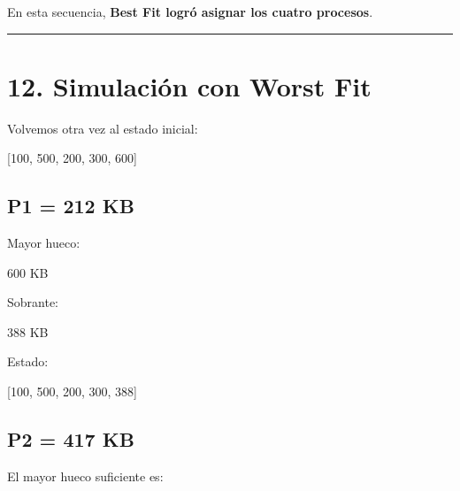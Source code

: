 \documentclass[
  spanish,
  letterpaper,
]{scrbook}
\newenvironment{Shaded}{\begin{snugshade}}{\end{snugshade}}
\newcommand{\NormalTok}[1]{\textcolor[rgb]{0.00,0.23,0.31}{#1}}
\begin{document}
En esta secuencia, \textbf{Best Fit logró asignar los cuatro procesos}.

\begin{center}\rule{0.5\linewidth}{0.5pt}\end{center}


\chapter{12. Simulación con Worst
Fit}\label{simulaciuxf3n-con-worst-fit-1}

Volvemos otra vez al estado inicial:

\begin{Shaded}
\begin{Highlighting}[]
\NormalTok{[100, 500, 200, 300, 600]}
\end{Highlighting}
\end{Shaded}

\section{P1 = 212 KB}\label{p1-212-kb-5}

Mayor hueco:

\begin{Shaded}
\begin{Highlighting}[]
\NormalTok{600 KB}
\end{Highlighting}
\end{Shaded}

Sobrante:

\begin{Shaded}
\begin{Highlighting}[]
\NormalTok{388 KB}
\end{Highlighting}
\end{Shaded}

Estado:

\begin{Shaded}
\begin{Highlighting}[]
\NormalTok{[100, 500, 200, 300, 388]}
\end{Highlighting}
\end{Shaded}

\section{P2 = 417 KB}\label{p2-417-kb-5}

El mayor hueco suficiente es:
\end{document}

